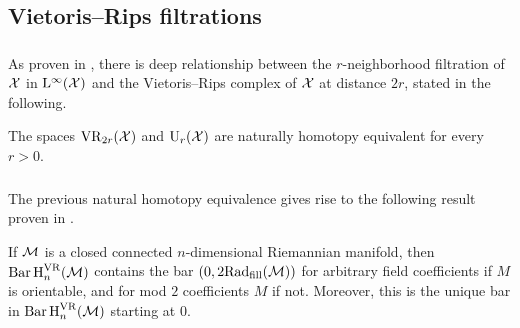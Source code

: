 

%


\subsection{Vietoris--Rips filtrations}

\subsubsection{}\label{ss:kuratowski_vr}

As proven in \cite[Thm.~4.1]{lim2020vietoris}, there is deep relationship between the \(r\)-neighborhood filtration of $\mathcal{X}$ in $\mathrm{L}^\infty(\mathcal{X})$ and the Vietoris--Rips complex of \(\mathcal{X}\) at distance \(2r\), stated in the following.

\medskip\lemma The spaces $\mathrm{VR}_{2r}(\mathcal{X})$ and $\mathrm{U}_r(\mathcal{X})$ are naturally homotopy equivalent for every \(r > 0\).

\subsubsection{}

The previous natural homotopy equivalence gives rise to the following result proven in \cite[Prop.~9.28]{lim2020vietoris}.

\medskip\lemma
If $\mathcal{M}$ is a closed connected $n$-dimensional Riemannian manifold, then \(\operatorname{Bar} \operatorname{H}_{n}^{\mathrm{VR}} (\mathcal{M})\) contains the bar \((0,2\mathrm{Rad}_{\mathrm{fill}}(\mathcal{M}))\) for arbitrary field coefficients if $M$ is orientable, and for mod $2$ coefficients $M$ if not.
Moreover, this is the unique bar in \(\operatorname{Bar} \operatorname{H}_{n}^{\mathrm{VR}} (\mathcal{M})\) starting at $0$.


